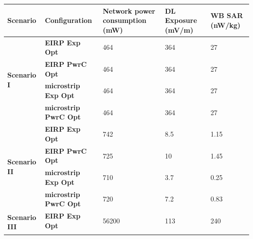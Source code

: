 \begin{table}[]
\begin{tabular}{|l|l|l|l|l|}
\hline                                                                                             %
\textbf{Scenario}                      & \textbf{Configuration}                   & \textbf{Network power consumption (mW)} & \textbf{DL Exposure (mV/m)} & \textbf{WB SAR (nW/kg)} \\ \hline
\multirow{4}{*}{\textbf{Scenario I}}   & \textbf{EIRP \acs{Exp Opt}}              &    464                                  &      364                    &     27                  \\ \cline{2-5}
                                       & \textbf{EIRP \acs{PwrC Opt}}             &    464                                  &      364                    &     27                  \\ \cline{2-5} 
                                       & \textbf{microstrip \acs{Exp Opt}}        &    464                                  &      364                    &     27                  \\ \cline{2-5} 
                                       & \textbf{microstrip \acs{PwrC Opt}}       &    464                                  &      364                    &     27                  \\ \hline
\multirow{4}{*}{\textbf{Scenario II}}  & \textbf{EIRP \acs{Exp Opt}}              &    742                                  &      8.5                    &     1.15                \\ \cline{2-5} 
                                       & \textbf{EIRP \acs{PwrC Opt}}             &    725                                  &      10                     &     1.45                \\ \cline{2-5} 
                                       & \textbf{microstrip \acs{Exp Opt}}        &    710                                  &      3.7                    &     0.25                \\ \cline{2-5} 
                                       & \textbf{microstrip \acs{PwrC Opt}}       &    720                                  &      7.2                    &     0.83                \\ \hline
\multirow{4}{*}{\textbf{Scenario III}} & \textbf{EIRP \acs{Exp Opt}}              &    56200                                &      113                    &     240                 \\ \cline{2-5} 

\end{tabular}
\end{table}
